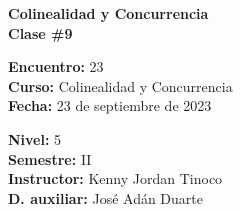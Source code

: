 \begin{center} \textbf
{
    \Large Colinealidad y Concurrencia \\ \vspace{2mm}Clase \#9
}
\end{center}

\begin{multicols}{2}
{
    \textbf{Encuentro:} 23\\
    \textbf{Curso:} Colinealidad y Concurrencia\\
    \textbf{Fecha:} 23 de septiembre de 2023\\
    \begin{flushright}
        \textbf{Nivel:} 5\\
        \textbf{Semestre:} II\\
        \textbf{Instructor:} Kenny Jordan Tinoco\\
        \textbf{D. auxiliar:} José Adán Duarte
    \end{flushright}
}
\end{multicols}

\thispagestyle{first-page-style}